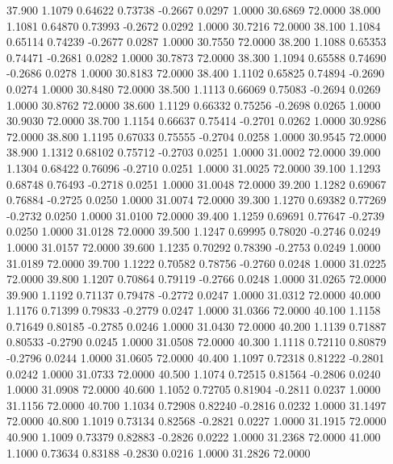  37.900   1.1079   0.64622   0.73738  -0.2667   0.0297   1.0000  30.6869  72.0000
  38.000   1.1081   0.64870   0.73993  -0.2672   0.0292   1.0000  30.7216  72.0000
  38.100   1.1084   0.65114   0.74239  -0.2677   0.0287   1.0000  30.7550  72.0000
  38.200   1.1088   0.65353   0.74471  -0.2681   0.0282   1.0000  30.7873  72.0000
  38.300   1.1094   0.65588   0.74690  -0.2686   0.0278   1.0000  30.8183  72.0000
  38.400   1.1102   0.65825   0.74894  -0.2690   0.0274   1.0000  30.8480  72.0000
  38.500   1.1113   0.66069   0.75083  -0.2694   0.0269   1.0000  30.8762  72.0000
  38.600   1.1129   0.66332   0.75256  -0.2698   0.0265   1.0000  30.9030  72.0000
  38.700   1.1154   0.66637   0.75414  -0.2701   0.0262   1.0000  30.9286  72.0000
  38.800   1.1195   0.67033   0.75555  -0.2704   0.0258   1.0000  30.9545  72.0000
  38.900   1.1312   0.68102   0.75712  -0.2703   0.0251   1.0000  31.0002  72.0000
  39.000   1.1304   0.68422   0.76096  -0.2710   0.0251   1.0000  31.0025  72.0000
  39.100   1.1293   0.68748   0.76493  -0.2718   0.0251   1.0000  31.0048  72.0000
  39.200   1.1282   0.69067   0.76884  -0.2725   0.0250   1.0000  31.0074  72.0000
  39.300   1.1270   0.69382   0.77269  -0.2732   0.0250   1.0000  31.0100  72.0000
  39.400   1.1259   0.69691   0.77647  -0.2739   0.0250   1.0000  31.0128  72.0000
  39.500   1.1247   0.69995   0.78020  -0.2746   0.0249   1.0000  31.0157  72.0000
  39.600   1.1235   0.70292   0.78390  -0.2753   0.0249   1.0000  31.0189  72.0000
  39.700   1.1222   0.70582   0.78756  -0.2760   0.0248   1.0000  31.0225  72.0000
  39.800   1.1207   0.70864   0.79119  -0.2766   0.0248   1.0000  31.0265  72.0000
  39.900   1.1192   0.71137   0.79478  -0.2772   0.0247   1.0000  31.0312  72.0000
  40.000   1.1176   0.71399   0.79833  -0.2779   0.0247   1.0000  31.0366  72.0000
  40.100   1.1158   0.71649   0.80185  -0.2785   0.0246   1.0000  31.0430  72.0000
  40.200   1.1139   0.71887   0.80533  -0.2790   0.0245   1.0000  31.0508  72.0000
  40.300   1.1118   0.72110   0.80879  -0.2796   0.0244   1.0000  31.0605  72.0000
  40.400   1.1097   0.72318   0.81222  -0.2801   0.0242   1.0000  31.0733  72.0000
  40.500   1.1074   0.72515   0.81564  -0.2806   0.0240   1.0000  31.0908  72.0000
  40.600   1.1052   0.72705   0.81904  -0.2811   0.0237   1.0000  31.1156  72.0000
  40.700   1.1034   0.72908   0.82240  -0.2816   0.0232   1.0000  31.1497  72.0000
  40.800   1.1019   0.73134   0.82568  -0.2821   0.0227   1.0000  31.1915  72.0000
  40.900   1.1009   0.73379   0.82883  -0.2826   0.0222   1.0000  31.2368  72.0000
  41.000   1.1000   0.73634   0.83188  -0.2830   0.0216   1.0000  31.2826  72.0000
